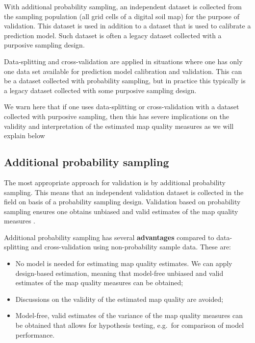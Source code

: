 \documentclass[10pt,b5paper,]{book}
\theoremstyle{definition}
\theoremstyle{definition}
\theoremstyle{definition}
\theoremstyle{remark}
\begin{document}
With additional probability sampling, an independent dataset is
collected from the sampling population (all grid cells of a digital soil
map) for the purpose of validation. This dataset is used in addition to
a dataset that is used to calibrate a prediction model. Such dataset is
often a legacy dataset collected with a purposive sampling design.

Data-splitting and cross-validation are applied in situations where one
has only one data set available for prediction model calibration and
validation. This can be a dataset collected with probability sampling,
but in practice this typically is a legacy dataset collected with some
purposive sampling design.

We warn here that if one uses data-splitting or cross-validation with a
dataset collected with purposive sampling, then this has severe
implications on the validity and interpretation of the estimated map
quality measures as we will explain below

\hypertarget{addProbSampling}{%
\subsection{Additional probability sampling}\label{addProbSampling}}

The most appropriate approach for validation is by additional
probability sampling. This means that an independent validation dataset
is collected in the field on basis of a probability sampling design.
Validation based on probability sampling ensures one obtains unbiased
and valid estimates of the map quality measures
\citep{brus2011sampling, stehman1999basic}.

Additional probability sampling has several \textbf{advantages} compared
to data-splitting and cross-validation using non-probability sample
data. These are:

\begin{itemize}
\item
  No model is needed for estimating map quality estimates. We can apply
  design-based estimation, meaning that model-free unbiased and valid
  estimates of the map quality measures can be obtained;
\item
  Discussions on the validity of the estimated map quality are avoided;
\item
  Model-free, valid estimates of the variance of the map quality
  measures can be obtained that allows for hypothesis testing, e.g.~for
  comparison of model performance.
\end{itemize}
\end{document}
